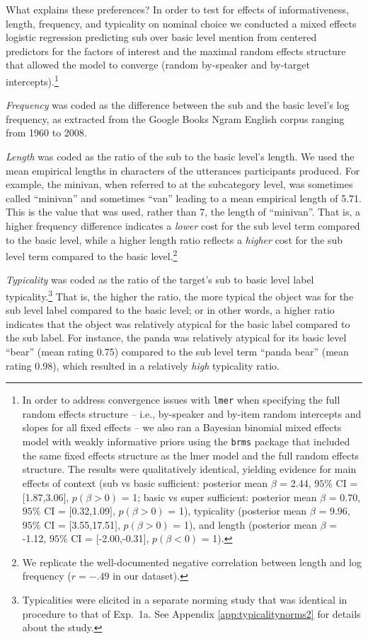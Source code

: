 \documentclass[11pt]{article}
\newcommand{\appref}[1]{Appendix \ref{#1}}
\begin{document}
What explains these preferences? In order to test for effects of informativeness, length, frequency, and typicality on nominal choice we conducted a mixed effects logistic regression predicting sub over basic level mention from centered predictors for the factors of interest and the maximal random effects structure that allowed the model to converge (random by-speaker and by-target intercepts).\footnote{In order to address convergence issues with \verb+lmer+ when specifying the full random effects structure -- i.e., by-speaker and by-item random intercepts and slopes for all fixed effects -- we also ran a Bayesian binomial mixed effects model with weakly informative priors using the \verb+brms+ package \cite{brms} that included the same fixed effects structure as the lmer model and the full random effects structure. The results were qualitatively identical, yielding  evidence for main effects of context (sub vs basic sufficient: posterior mean $\beta$ = 2.44, $95\%$ CI = $[$1.87,3.06$]$, $p(\beta > 0)$ = 1; basic vs super sufficient: posterior mean $\beta$ = 0.70, $95\%$ CI = $[$0.32,1.09$]$, $p(\beta > 0)$ = 1), typicality (posterior mean $\beta$ = 9.96, $95\%$ CI = $[$3.55,17.51$]$, $p(\beta > 0)$ = 1), and length (posterior mean $\beta$ = -1.12, $95\%$ CI = $[$-2.00,-0.31$]$, $p(\beta < 0)$ = 1).} 

\emph{Frequency} was coded as the difference between the sub and the basic level's log frequency, as extracted from the Google Books Ngram English corpus ranging from 1960 to 2008. 

\emph{Length} was coded as the ratio of the sub to the basic level's length. We used the mean empirical lengths in characters of the utterances participants produced. For example, the minivan, when referred to at the subcategory level, was sometimes called ``minivan'' and sometimes ``van'' leading to a mean empirical length of 5.71. This is the value that was used, rather than 7, the length of ``minivan''. That is, a higher frequency difference indicates a \emph{lower} cost for the sub level term compared to the basic level, while a higher length ratio reflects a \emph{higher} cost for the sub level term compared to the basic level.\footnote{We replicate the well-documented negative correlation between length and log frequency ($r = -.49$ in our dataset).} 

\emph{Typicality} was coded as the ratio of the target's sub to basic level label typicality.\footnote{Typicalities were elicited in a separate norming study that was identical in procedure to that of Exp.~1a. See \appref{app:typicalitynorms2} for details about the study.} That is, the higher the ratio, the more typical the object was for the sub level label compared to the basic level; or in other words, a higher ratio indicates that the object was relatively atypical for the basic label compared to the sub label. For instance, the panda was relatively atypical for its basic level ``bear'' (mean rating 0.75) compared to the sub level term ``panda bear'' (mean rating 0.98), which resulted in a relatively \emph{high} typicality ratio.
\end{document}
